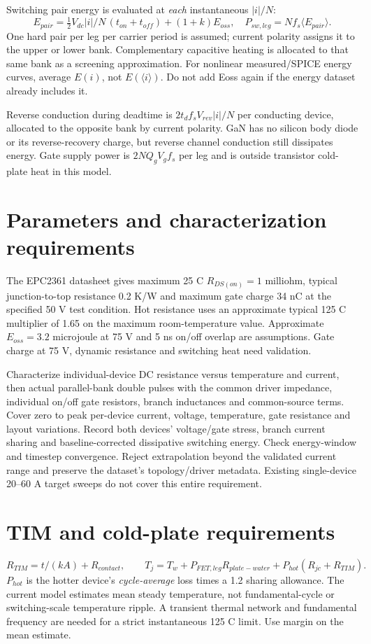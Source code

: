 ﻿\documentclass[a4paper,10pt]{article}
\begin{document}
Switching pair energy is evaluated at \emph{each} instantaneous $|i|/N$:
\[E_{pair}=\tfrac12 V_{dc}|i|/N\,(t_{on}+t_{off})+(1+k)E_{oss},\quad
 P_{sw,leg}=Nf_s\langle E_{pair}\rangle.\]
One hard pair per leg per carrier period is assumed; current polarity assigns
it to the upper or lower bank. Complementary capacitive heating is allocated
to that same bank as a screening approximation. For nonlinear measured/SPICE
energy curves, average $E(i)$, not $E(\langle i\rangle)$. Do not add Eoss again
if the energy dataset already includes it.

Reverse conduction during deadtime is $2t_df_sV_{rev}|i|/N$ per conducting
device, allocated to the opposite bank by current polarity. GaN has no silicon
body diode or its reverse-recovery charge, but reverse channel conduction
still dissipates energy. Gate supply power is $2NQ_gV_gf_s$ per leg and is
outside transistor cold-plate heat in this model.

\section{Parameters and characterization requirements}
The EPC2361 datasheet gives maximum 25 C $R_{DS(on)}=1$ milliohm,
typical junction-to-top resistance 0.2 K/W and maximum gate charge 34 nC at
the specified 50 V test condition. Hot resistance uses an approximate typical
125 C multiplier of 1.65 on the maximum room-temperature value. Approximate
$E_{oss}=3.2$ microjoule at 75 V and 5 ns on/off overlap are assumptions.
Gate charge at 75 V, dynamic resistance and switching heat need validation.

Characterize individual-device DC resistance versus temperature and current,
then actual parallel-bank double pulses with the common driver impedance,
individual on/off gate resistors, branch inductances and common-source terms.
Cover zero to peak per-device current, voltage, temperature, gate resistance
and layout variations. Record both devices' voltage/gate stress, branch
current sharing and baseline-corrected dissipative switching energy. Check
energy-window and timestep convergence. Reject extrapolation beyond the
validated current range and preserve the dataset's topology/driver metadata.
Existing single-device 20--60 A target sweeps do not cover this entire requirement.

\section{TIM and cold-plate requirements}
\[R_{TIM}=t/(kA)+R_{contact},\qquad
 T_j=T_w+P_{FET,leg}R_{plate-water}+P_{hot}(R_{jc}+R_{TIM}).\]
$P_{hot}$ is the hotter device's \emph{cycle-average} loss times a 1.2 sharing
allowance. The current model estimates mean steady temperature, not
fundamental-cycle or switching-scale temperature ripple. A transient thermal
network and fundamental frequency are needed for a strict instantaneous
125 C limit. Use margin on the mean estimate.
\end{document}
